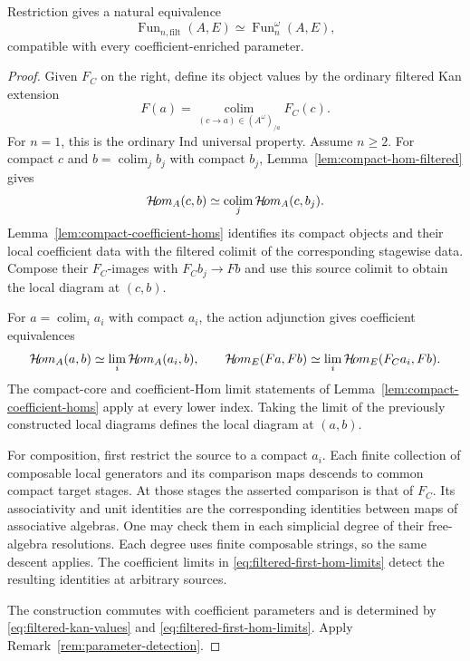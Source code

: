 \begin{proposition}\label{prop:filtered-extension}
Restriction gives a natural equivalence
\[
 \operatorname{Fun}_{n,\mathrm{filt}}(A,E)
 \simeq\operatorname{Fun}_n^\omega(A,E),
\]
compatible with every coefficient-enriched parameter.
\end{proposition}

\begin{proof}
Given $F_C$ on the right, define its object values by the ordinary
filtered Kan extension
\begin{equation}\label{eq:filtered-kan-values}
 F(a)=\operatorname*{colim}_{(c\to a)\in(A^\omega)_{/a}}F_C(c).
\end{equation}
For $n=1$, this is the ordinary Ind universal property.
Assume $n\geq2$. For compact $c$ and
$b=\operatorname{colim}_jb_j$ with compact $b_j$,
Lemma~\ref{lem:compact-hom-filtered} gives
\[
 \mathcal{H}\!om_A(c,b)\simeq\operatorname*{colim}_j\mathcal{H}\!om_A(c,b_j).
\]
Lemma~\ref{lem:compact-coefficient-homs} identifies its compact
objects and their local coefficient data with the filtered colimit
of the corresponding stagewise data. Compose their $F_C$-images
with $F_Cb_j\to Fb$ and use this source colimit to obtain the local
diagram at $(c,b)$.

For $a=\operatorname{colim}_ia_i$ with compact $a_i$, the action
adjunction gives coefficient equivalences
\begin{equation}\label{eq:filtered-first-hom-limits}
 \mathcal{H}\!om_A(a,b)\simeq\lim_i\mathcal{H}\!om_A(a_i,b),\qquad
 \mathcal{H}\!om_E(Fa,Fb)\simeq\lim_i\mathcal{H}\!om_E(F_Ca_i,Fb).
\end{equation}
The compact-core and coefficient-Hom limit statements of
Lemma~\ref{lem:compact-coefficient-homs} apply at every lower index.
Taking the limit of the previously constructed local diagrams defines
the local diagram at $(a,b)$.

For composition, first restrict the source to a compact $a_i$.
Each finite collection of composable local generators and its
comparison maps descends to common compact target stages. At those
stages the asserted comparison is that of $F_C$. Its associativity
and unit identities are the corresponding identities between maps
of associative algebras. One may check them in each simplicial
degree of their free-algebra resolutions. Each degree uses finite
composable strings, so the same descent applies. The coefficient
limits in \eqref{eq:filtered-first-hom-limits} detect the resulting
identities at arbitrary sources.

The construction commutes with coefficient parameters and is determined by
\eqref{eq:filtered-kan-values} and \eqref{eq:filtered-first-hom-limits}.
Apply Remark~\ref{rem:parameter-detection}.
\end{proof}

